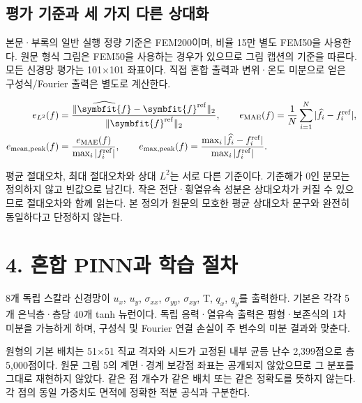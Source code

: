 \documentclass[10pt,a4paper]{article}
\renewcommand{\boldsymbol}[1]{\symbfit{#1}}
\begin{document}
\subsection{평가 기준과 세 가지 다른 상대화}

본문·부록의 일반 실행 정량 기준은 FEM200이며, 비율 15만 별도 FEM50을 사용한다. 원문 형식 그림은 FEM50을 사용하는 경우가 있으므로 그림 캡션의 기준을 따른다. 모든 신경망 평가는 101$\times$101 좌표이다. 직접 혼합 출력과 변위·온도 미분으로 얻은 구성식/Fourier 출력은 별도로 계산한다.\par

\begin{equation}\begin{aligned}e_{L^2}(f)&=\frac{\|\widehat{\boldsymbol f}-\boldsymbol f^{\mathrm{ref}}\|_2}{\|\boldsymbol f^{\mathrm{ref}}\|_2},\qquad e_{\mathrm{MAE}}(f)=\frac1N\sum_{i=1}^{N}|\widehat f_i-f_i^{\mathrm{ref}}|,\\ e_{\mathrm{mean,peak}}(f)&=\frac{e_{\mathrm{MAE}}(f)}{\max_i|f_i^{\mathrm{ref}}|},\qquad e_{\mathrm{max,peak}}(f)=\frac{\max_i|\widehat f_i-f_i^{\mathrm{ref}}|}{\max_i|f_i^{\mathrm{ref}}|}.\end{aligned}\end{equation}

평균 절대오차, 최대 절대오차와 상대 $L^2$는 서로 다른 기준이다. 기준해가 0인 분모는 정의하지 않고 빈값으로 남긴다. 작은 전단·횡열유속 성분은 상대오차가 커질 수 있으므로 절대오차와 함께 읽는다. 본 정의가 원문의 모호한 평균 상대오차 문구와 완전히 동일하다고 단정하지 않는다.\par

\clearpage

\section{4. 혼합 PINN과 학습 절차}

8개 독립 스칼라 신경망이 $u_x$, $u_y$, $\sigma_{xx}$, $\sigma_{yy}$, $\sigma_{xy}$, T, $q_x$, $q_y$를 출력한다. 기본은 각각 5개 은닉층·층당 40개 tanh 뉴런이다. 독립 응력·열유속 출력은 평형·보존식의 1차 미분을 가능하게 하며, 구성식 및 Fourier 연결 손실이 주 변수의 미분 결과와 맞춘다.\par

{\small\color{muted} 원형의 기본 배치는 51$\times$51 직교 격자와 시드가 고정된 내부 균등 난수 2,399점으로 총 5,000점이다. 원문 그림 5의 계면·경계 보강점 좌표는 공개되지 않았으므로 그 분포를 그대로 재현하지 않았다. 같은 점 개수가 같은 배치 또는 같은 정확도를 뜻하지 않는다. 각 점의 동일 가중치도 면적에 정확한 적분 공식과 구분한다.\par}
\end{document}
